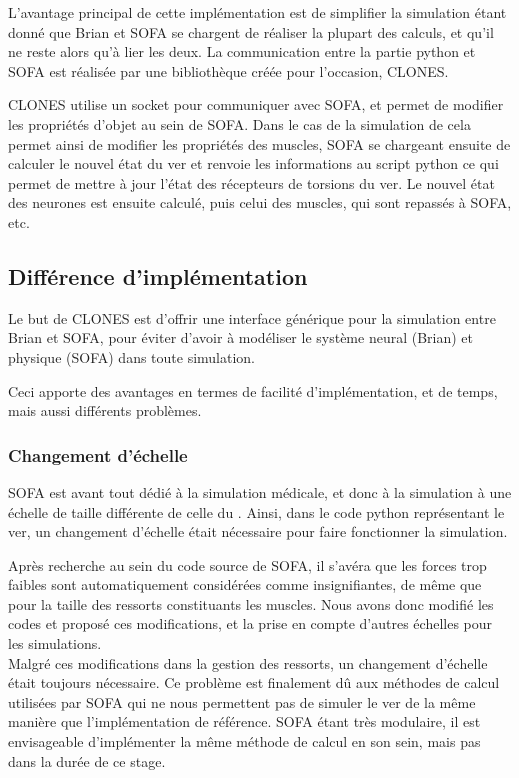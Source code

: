 L'avantage principal de cette implémentation est de simplifier la simulation
étant donné que Brian et SOFA se chargent de réaliser la plupart des calculs, et
qu'il ne reste alors qu'à lier les deux. La communication entre la partie
python et SOFA est réalisée par une bibliothèque créée pour l'occasion, CLONES.

CLONES utilise un socket pour communiquer avec SOFA, et permet de modifier les
propriétés d'objet au sein de SOFA. Dans le cas de la simulation de \celeg{}
cela permet ainsi de modifier les propriétés des muscles, SOFA se chargeant
ensuite de calculer le nouvel état du ver et renvoie les informations au script
python ce qui permet de mettre à jour l'état des récepteurs de torsions du ver.
Le nouvel état des neurones est ensuite calculé, puis celui des muscles, qui
sont repassés à SOFA, etc.


\subsection{Différence d'implémentation} %
\label{sub:Différence d'implémentation}

Le but de CLONES est d'offrir une interface générique pour
la simulation entre Brian et SOFA, pour éviter d'avoir à modéliser
le système neural (Brian) et physique (SOFA) dans toute simulation.

Ceci apporte des avantages en termes de facilité d'implémentation,
et de temps, mais aussi différents problèmes.

\subsubsection{Changement d'échelle} %
\label{subs:Changement d'échelle}

SOFA est avant tout dédié à la simulation médicale, et donc à la simulation à
une échelle de taille différente de celle du \celeg{}. Ainsi, dans le code
python représentant le ver, un changement d'échelle était nécessaire pour faire
fonctionner la simulation.

Après recherche au sein du code source de SOFA, il s'avéra que les forces trop
faibles sont automatiquement considérées comme insignifiantes, de même que pour
 la taille des ressorts constituants les muscles. Nous avons donc modifié
les codes et proposé ces modifications, et la prise en compte d'autres échelles
pour les simulations.\\


Malgré ces modifications dans la gestion des ressorts, un changement d'échelle
était toujours nécessaire.
Ce problème est finalement dû aux méthodes de calcul utilisées par SOFA qui ne
nous permettent pas de simuler le ver de la même manière que l'implémentation de
référence. SOFA étant très modulaire, il est envisageable d'implémenter la même
méthode de calcul en son sein, mais pas dans la durée de ce stage.




